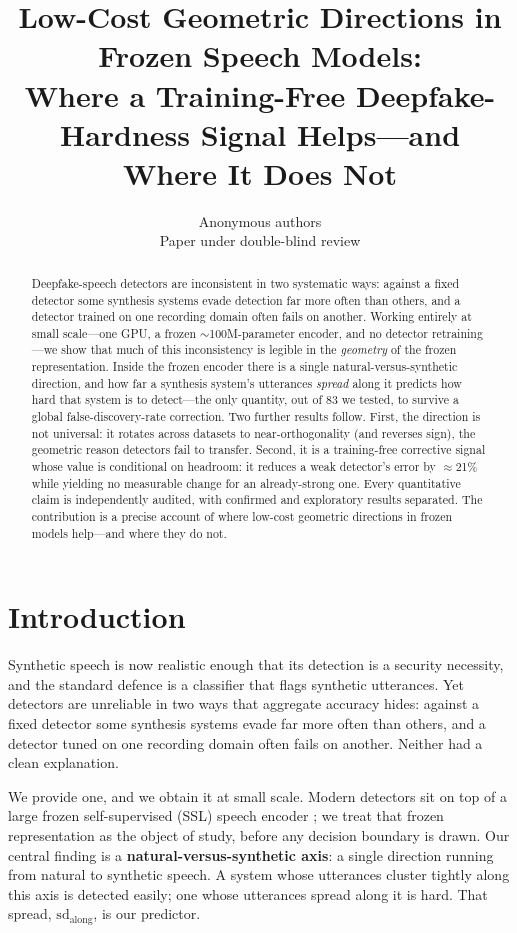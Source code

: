 \documentclass{article}
\title{Low-Cost Geometric Directions in Frozen Speech Models:\\
Where a Training-Free Deepfake-Hardness Signal Helps---and Where It Does Not}
\author{Anonymous authors\\Paper under double-blind review}
\begin{document}
\linenumbers
\maketitle

\begin{abstract}
Deepfake-speech detectors are inconsistent in two systematic ways: against a
fixed detector some synthesis systems evade detection far more often than others,
and a detector trained on one recording domain often fails on another. Working
entirely at small scale---one GPU, a frozen $\sim$100M-parameter encoder, and no
detector retraining---we show that much of this inconsistency is legible in the
\emph{geometry} of the frozen representation. Inside the frozen encoder there is a
single natural-versus-synthetic direction, and how far a synthesis system's
utterances \emph{spread} along it predicts how hard that system is to detect---the
only quantity, out of 83 we tested, to survive a global false-discovery-rate
correction. Two further results follow. First, the direction is not universal: it
rotates across datasets to near-orthogonality (and reverses sign), the geometric
reason detectors fail to transfer. Second, it is a training-free corrective signal
whose value is conditional on headroom: it reduces a weak detector's error by
$\approx$21\% while yielding no measurable change for an already-strong one. Every
quantitative claim is independently audited, with confirmed and exploratory results
separated. The contribution is a precise account of where low-cost geometric
directions in frozen models help---and where they do not.
\end{abstract}

\section{Introduction}
Synthetic speech is now realistic enough that its detection is a security
necessity, and the standard defence is a classifier that flags synthetic
utterances. Yet detectors are unreliable in two ways that aggregate accuracy
hides: against a fixed detector some synthesis systems evade far more often than
others, and a detector tuned on one recording domain often fails on another.
Neither had a clean explanation.

We provide one, and we obtain it at small scale. Modern detectors sit on top of a
large frozen self-supervised (SSL) speech encoder \citep{chen2022wavlm}; we treat
that frozen representation as the object of study, before any decision boundary is
drawn. Our central finding is a \textbf{natural-versus-synthetic axis}: a single
direction running from natural to synthetic speech. A system whose utterances
cluster tightly along this axis is detected easily; one whose utterances spread
along it is hard. That spread, $\mathrm{sd}_{\mathrm{along}}$, is our predictor.
\end{document}
